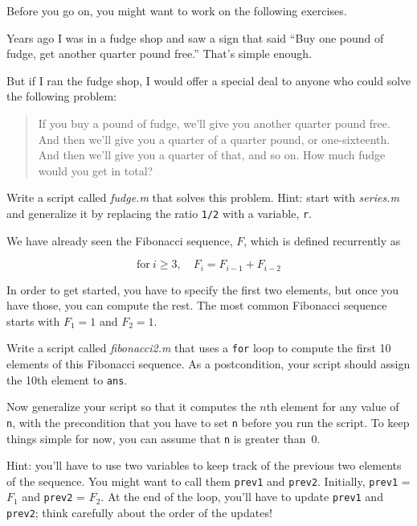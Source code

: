 \documentclass[../../book.tex]{subfiles}
\begin{document}
Before you go on, you might want to work on the following exercises.

\begin{ex}
Years ago I was in a fudge shop and saw a sign that said ``Buy one pound of fudge, get another quarter pound free.''  That's simple enough.

But if I ran the fudge shop, I would offer a special deal to anyone who could solve the following problem:

\begin{quote}
If you buy a pound of fudge, we'll give you another quarter pound free.  And then we'll give you a quarter of a quarter pound, or one-sixteenth.  And then we'll give you a quarter of that, and so on.  How much fudge would you get in total?
\end{quote}

Write a script called \emph{fudge.m} that solves this problem.  Hint: start with \emph{series.m} and generalize it by replacing the ratio \lstinline{1/2} with a variable, \lstinline{r}.

\end{ex}




\begin{ex}
\label{fib2}

We have already seen the Fibonacci sequence, $F$, which
is defined recurrently as

\[ \mathrm{for}~i \ge 3, \quad  F_{i} = F_{i-1} + F_{i-2} \]

In order to get started, you have to specify the first two
elements, but once you have those, you can compute the rest.
The most common Fibonacci sequence starts with $F_1 = 1$ and $F_2 = 1$.

Write a script called \emph{fibonacci2.m} that uses a \lstinline{for} loop
to compute the first 10 elements of this Fibonacci sequence.
As a postcondition, your script should assign the 10th element to
\lstinline{ans}.

Now generalize your script so that it computes the $n$th element
for any value of \lstinline{n}, with the precondition that you have to
set \lstinline{n} before you run the script.  To keep things simple for
now, you can assume that \lstinline{n} is greater than~0.

Hint: you'll have to use two variables to keep track of the
previous two elements of the sequence.  You might want to call
them \lstinline{prev1} and \lstinline{prev2}.  Initially, \lstinline{prev1} = $F_1$
and \lstinline{prev2} = $F_2$.  At the end of the loop, you'll have
to update \lstinline{prev1} and \lstinline{prev2}; think carefully about the
order of the updates!

\end{ex}
\end{document}
